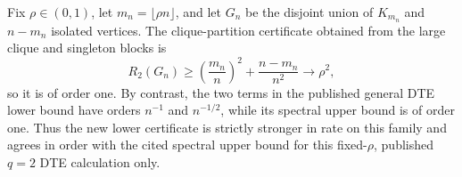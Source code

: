 Fix \(\rho\in(0,1)\), let \(m_n=\lfloor\rho n\rfloor\), and let \(G_n\) be the disjoint union of \(K_{m_n}\) and \(n-m_n\) isolated vertices. The clique-partition certificate obtained from the large clique and singleton blocks is
\[
R_2(G_n)\geq
\left(\frac{m_n}{n}\right)^2+\frac{n-m_n}{n^2}
\longrightarrow\rho^2,
\]
so it is of order one. By contrast, the two terms in the published general DTE lower bound have orders \(n^{-1}\) and \(n^{-1/2}\), while its spectral upper bound is of order one. Thus the new lower certificate is strictly stronger in rate on this family and agrees in order with the cited spectral upper bound for this fixed-\(\rho\), published \(q=2\) DTE calculation only.
